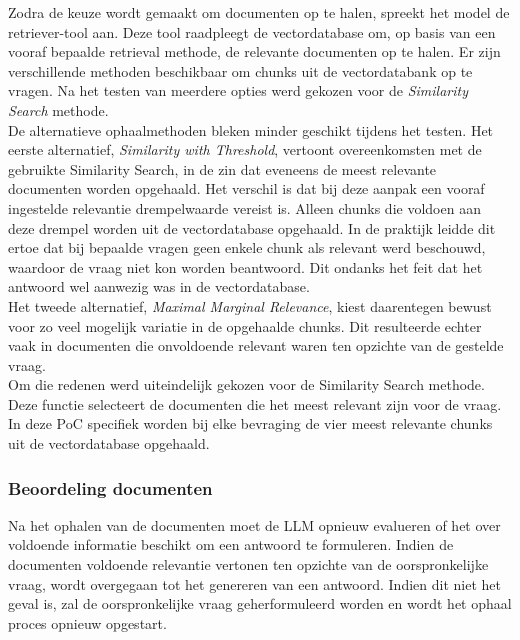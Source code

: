 Zodra de keuze wordt gemaakt om documenten op te halen, spreekt het model de retriever-tool aan. Deze tool raadpleegt de vectordatabase om, op basis van een vooraf bepaalde retrieval methode, de relevante documenten op te halen. Er zijn verschillende methoden beschikbaar om chunks uit de vectordatabank op te vragen. Na het testen van meerdere opties werd gekozen voor de \textit{Similarity Search} methode.
\\[1em]
De alternatieve ophaalmethoden bleken minder geschikt tijdens het testen. Het eerste alternatief, \textit{Similarity with Threshold}, vertoont overeenkomsten met de gebruikte Similarity Search, in de zin dat eveneens de meest relevante documenten worden opgehaald. Het verschil is dat bij deze aanpak een vooraf ingestelde relevantie drempelwaarde vereist is. Alleen chunks die voldoen aan deze drempel worden uit de vectordatabase opgehaald. In de praktijk leidde dit ertoe dat bij bepaalde vragen geen enkele chunk als relevant werd beschouwd, waardoor de vraag niet kon worden beantwoord. Dit ondanks het feit dat het antwoord wel aanwezig was in de vectordatabase.  
\\[1em]
Het tweede alternatief, \textit{Maximal Marginal Relevance}, kiest daarentegen bewust voor zo veel mogelijk variatie in de opgehaalde chunks. Dit resulteerde echter vaak in documenten die onvoldoende relevant waren ten opzichte van de gestelde vraag.  
\\[1em]
Om die redenen werd uiteindelijk gekozen voor de Similarity Search methode. Deze functie selecteert de documenten die het meest relevant zijn voor de vraag. In deze PoC specifiek worden bij elke bevraging de vier meest relevante chunks uit de vectordatabase opgehaald.

\subsubsection{Beoordeling documenten}

Na het ophalen van de documenten moet de LLM opnieuw evalueren of het over voldoende informatie beschikt om een antwoord te formuleren. Indien de documenten voldoende relevantie vertonen ten opzichte van de oorspronkelijke vraag, wordt overgegaan tot het genereren van een antwoord. Indien dit niet het geval is, zal de oorspronkelijke vraag geherformuleerd worden en wordt het ophaal proces opnieuw opgestart.

